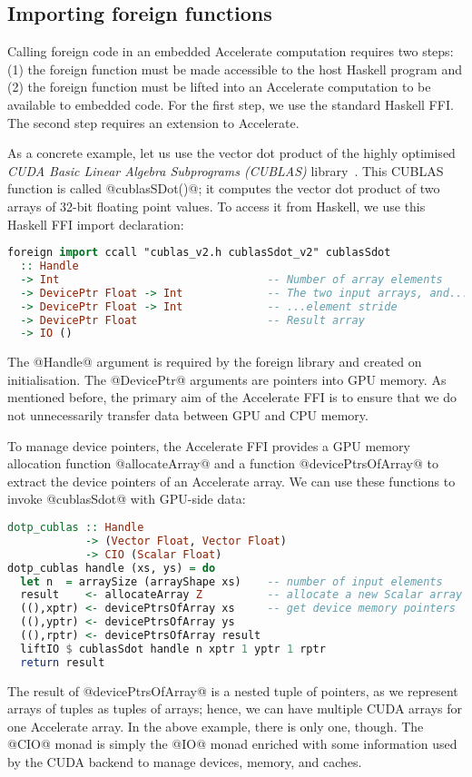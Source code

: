 \subsection{Importing foreign functions}

Calling foreign code in an embedded Accelerate computation requires two steps: (1) the foreign function must be made accessible to the host Haskell program and (2) the foreign function must be lifted into an Accelerate computation to be available to embedded code. For the first step, we use the standard Haskell FFI. The second step requires an extension to Accelerate.

As a concrete example, let us use the vector dot product of the highly optimised \emph{CUDA Basic Linear Algebra Subprograms (CUBLAS)} library~\cite{cublas}. This CUBLAS function is called @cublasSDot()@; it computes the vector dot product of two arrays of 32-bit floating point values. To access it from Haskell, we use this Haskell FFI import declaration:
%
\begin{lstlisting}[language=haskell]
foreign import ccall "cublas_v2.h cublasSdot_v2" cublasSdot
  :: Handle
  -> Int                                -- Number of array elements
  -> DevicePtr Float -> Int             -- The two input arrays, and...
  -> DevicePtr Float -> Int             -- ...element stride
  -> DevicePtr Float                    -- Result array
  -> IO ()
\end{lstlisting}
%
The @Handle@ argument is required by the foreign library and created on
initialisation. The @DevicePtr@ arguments are pointers into GPU memory. As mentioned before, the primary aim of the Accelerate FFI is to ensure that we do not unnecessarily transfer data between GPU and CPU memory.

To manage device pointers, the Accelerate FFI provides a GPU memory allocation function @allocateArray@ and a function @devicePtrsOfArray@ to extract the device pointers of an Accelerate array. We can use these functions to invoke @cublasSdot@ with GPU-side data:
%
\begin{lstlisting}[language=haskell]
dotp_cublas :: Handle
            -> (Vector Float, Vector Float)
            -> CIO (Scalar Float)
dotp_cublas handle (xs, ys) = do
  let n  = arraySize (arrayShape xs)    -- number of input elements
  result    <- allocateArray Z          -- allocate a new Scalar array
  ((),xptr) <- devicePtrsOfArray xs     -- get device memory pointers
  ((),yptr) <- devicePtrsOfArray ys
  ((),rptr) <- devicePtrsOfArray result
  liftIO $ cublasSdot handle n xptr 1 yptr 1 rptr
  return result
\end{lstlisting}
%
The result of @devicePtrsOfArray@ is a nested tuple of pointers, as we represent arrays of tuples as tuples of arrays; hence, we can have multiple CUDA arrays for one Accelerate array. In the above example, there is only one, though. The @CIO@ monad is simply the @IO@ monad enriched with some information used by the CUDA backend to manage devices, memory, and caches.

